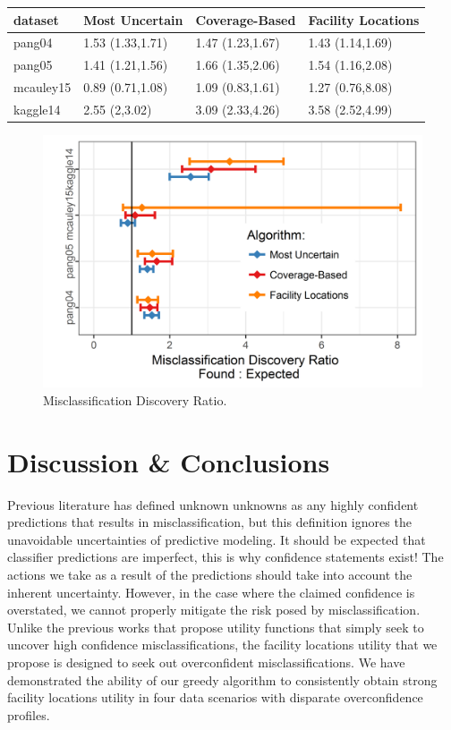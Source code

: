 \documentclass[letterpaper]{article} %
\begin{document}
\begin{table}[ht]
\centering
\begin{tabular}{llll}
  \hline
dataset & Most Uncertain & Coverage-Based & Facility Locations \\ 
  \hline
pang04 & 1.53 (1.33,1.71) & 1.47 (1.23,1.67) & 1.43 (1.14,1.69) \\ 
  pang05 & 1.41 (1.21,1.56) & 1.66 (1.35,2.06) & 1.54 (1.16,2.08) \\ 
  mcauley15 & 0.89 (0.71,1.08) & 1.09 (0.83,1.61) & 1.27 (0.76,8.08) \\ 
  kaggle14 & 2.55 (2,3.02) & 3.09 (2.33,4.26) & 3.58 (2.52,4.99) \\ 
   \hline
\end{tabular}
\end{table}


\begin{figure}[hbtp]
  \includegraphics[width=.49\textwidth]{../experimentsAndPlots/discoveryRatioPlaceholder.png}
  \caption{Misclassification Discovery Ratio.}
  \label{fig:discratio}
\end{figure}



\section{Discussion \& Conclusions}

Previous literature has defined unknown unknowns as any highly confident predictions that results in misclassification, but this definition ignores the unavoidable uncertainties of predictive modeling. It should be expected that classifier predictions are imperfect, this is why confidence statements exist! The actions we take as a result of the predictions should take into account the inherent uncertainty. However, in the case where the claimed confidence is overstated, we cannot properly mitigate the risk posed by misclassification. Unlike the previous works that propose utility functions that simply seek to uncover high confidence misclassifications, the facility locations utility that we propose is designed to seek out overconfident misclassifications. We have demonstrated the ability of our greedy algorithm to consistently obtain strong facility locations utility in four data scenarios with disparate overconfidence profiles. 
\end{document}
